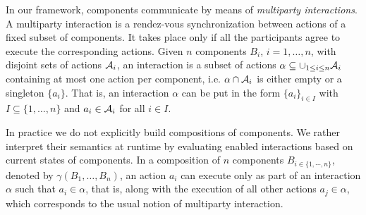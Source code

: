   In our framework, components communicate by means of
  \emph{multiparty interactions}.
  A multiparty interaction is a rendez-vous synchronization between actions of
  a fixed subset of components. It takes
  place only if all the participants agree to execute the corresponding actions.
  Given $n$ components $B_i$, $i=1,\dots,n$, with disjoint sets of actions
  $\mathcal{A}_i$, an interaction is a subset of actions $\alpha \subseteq \cup_{1 \leq  i \leq n}\mathcal{A}_i$
  containing at most one action per component, i.e. $\alpha \cap\mathcal{A}_i$ is either empty or a singleton $\{ a_i \}$.
  That is, an interaction 
  $\alpha$ can be put in the form $\{ a_i \}_{i \in I}$ with $I \subseteq \{ 1, \ldots, n \}$ and $a_i \in\mathcal{A}_i$ for all $i \in I$.

In practice we do not explicitly build compositions of components.
We rather interpret their semantics at runtime by evaluating enabled interactions based on current states of components.
In a composition of $n$ components $B_{i\in\{1,\cdots,n\}}$, denoted by $\gamma(B_1, \ldots, B_n)$,
an action $a_i$ can execute only as part of an interaction $\alpha$ such that $a_i \in
\alpha$, that is, along with the execution of all other actions $a_j
\in \alpha$, which corresponds to the usual notion of multiparty
interaction.

